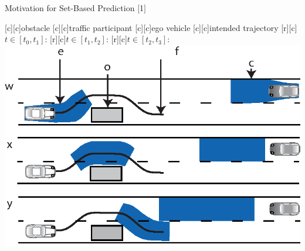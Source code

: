
\begin{frame}
\end{frame}


\begin{frame}
\end{frame}


\begin{frame}
\end{frame}


\begin{frame}
\end{frame}


\begin{frame}
\end{frame}


\begin{frame}{Motivation for Set-Based Prediction $[$1$]$}

	\centering	
	\footnotesize
      [c][c]{obstacle}						
      [c][c]{traffic participant}
      [c][c]{ego vehicle}
      [c][c]{intended trajectory}      
      [r][c]{$t \in [t_0, t_1]$:}
      [r][c]{$t \in [t_1, t_2]$:}
      [r][c]{$t \in [t_2, t_3]$:}
      \includegraphics[width=0.8\columnwidth, height=0.74\textheight, keepaspectratio]{./figures/snapshots_blue.eps}
\end{frame}


